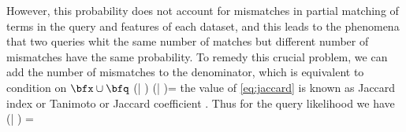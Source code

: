 \documentclass[twoside,11pt]{article}
\begin{document}
However, this probability does not account for mismatches in partial matching of terms in the query and features of each dataset, and this leads to the phenomena that two queries whit the same number of matches but different number of mismatches have the same probability. To remedy this crucial problem, we can add the number of mismatches to the denominator, which is equivalent to condition on $\bfx \cup \bfq$
\beq \label{eq:jaccard}
\widehat{\pr}(\bfq | \bfx ) \propto \pr(\bfq | \bfx \cup \bfq)= \frac{|\bfq \cap \bfx|}{|\bfq \cup \bfx|}
\eeq
the value of \eqref{eq:jaccard} is known as Jaccard index or Tanimoto or Jaccard coefficient \cite{book:IR}. Thus for the query likelihood we have
\beq \label{eq:jaccard}
\pr(\bfq | \bfx ) = 
\eeq
\end{document}
